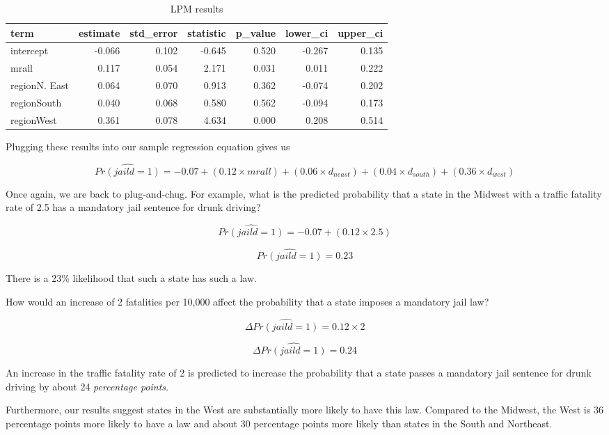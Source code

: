 \documentclass[
]{book}
\begin{document}
\begin{table}

\caption{\label{tab:lpmresults}LPM results}
\centering
\begin{tabular}[t]{l|r|r|r|r|r|r}
\hline
term & estimate & std\_error & statistic & p\_value & lower\_ci & upper\_ci\\
\hline
intercept & -0.066 & 0.102 & -0.645 & 0.520 & -0.267 & 0.135\\
\hline
mrall & 0.117 & 0.054 & 2.171 & 0.031 & 0.011 & 0.222\\
\hline
regionN. East & 0.064 & 0.070 & 0.913 & 0.362 & -0.074 & 0.202\\
\hline
regionSouth & 0.040 & 0.068 & 0.580 & 0.562 & -0.094 & 0.173\\
\hline
regionWest & 0.361 & 0.078 & 4.634 & 0.000 & 0.208 & 0.514\\
\hline
\end{tabular}
\end{table}

Plugging these results into our sample regression equation gives us

\[\hat{Pr(jaild=1)}= -0.07 + (0.12 \times mrall) + (0.06 \times d_{neast}) + (0.04 \times d_{south}) + (0.36 \times d_{west})\]

Once again, we are back to plug-and-chug. For example, what is the predicted probability that a state in the Midwest with a traffic fatality rate of 2.5 has a mandatory jail sentence for drunk driving?

\[\hat{Pr(jaild=1)}= -0.07 + (0.12 \times 2.5)\]

\[\hat{Pr(jaild=1)}=0.23\]

There is a 23\% likelihood that such a state has such a law.

How would an increase of 2 fatalities per 10,000 affect the probability that a state imposes a mandatory jail law?

\[\Delta \hat{Pr(jaild=1)}=0.12 \times 2\]

\[\Delta \hat{Pr(jaild=1)}=0.24\]

An increase in the traffic fatality rate of 2 is predicted to increase the probability that a state passes a mandatory jail sentence for drunk driving by about 24 \emph{percentage points}.

Furthermore, our results suggest states in the West are substantially more likely to have this law. Compared to the Midwest, the West is 36 percentage points more likely to have a law and about 30 percentage points more likely than states in the South and Northeast.
\end{document}
